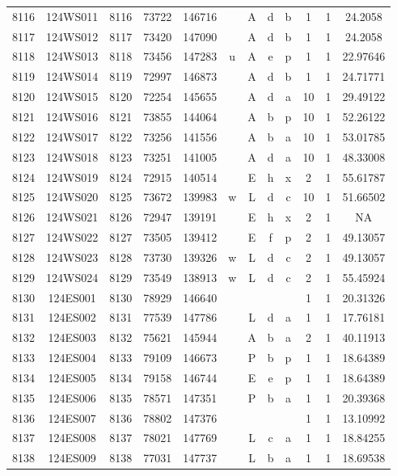 \begin{tabular}{|*{12}{c|}}
8116 & 124WS011 & 8116 & 73722 & 146716 &  & A & d & b & 1 & 1 & 24.2058 \\ 
8117 & 124WS012 & 8117 & 73420 & 147090 &  & A & d & b & 1 & 1 & 24.2058 \\ 
8118 & 124WS013 & 8118 & 73456 & 147283 & u & A & e & p & 1 & 1 & 22.97646 \\ 
8119 & 124WS014 & 8119 & 72997 & 146873 &  & A & d & b & 1 & 1 & 24.71771 \\ 
8120 & 124WS015 & 8120 & 72254 & 145655 &  & A & d & a & 10 & 1 & 29.49122 \\ 
8121 & 124WS016 & 8121 & 73855 & 144064 &  & A & b & p & 10 & 1 & 52.26122 \\ 
8122 & 124WS017 & 8122 & 73256 & 141556 &  & A & b & a & 10 & 1 & 53.01785 \\ 
8123 & 124WS018 & 8123 & 73251 & 141005 &  & A & d & a & 10 & 1 & 48.33008 \\ 
8124 & 124WS019 & 8124 & 72915 & 140514 &  & E & h & x & 2 & 1 & 55.61787 \\ 
8125 & 124WS020 & 8125 & 73672 & 139983 & w & L & d & c & 10 & 1 & 51.66502 \\ 
8126 & 124WS021 & 8126 & 72947 & 139191 &  & E & h & x & 2 & 1 & NA \\ 
8127 & 124WS022 & 8127 & 73505 & 139412 &  & E & f & p & 2 & 1 & 49.13057 \\ 
8128 & 124WS023 & 8128 & 73730 & 139326 & w & L & d & c & 2 & 1 & 49.13057 \\ 
8129 & 124WS024 & 8129 & 73549 & 138913 & w & L & d & c & 2 & 1 & 55.45924 \\ 
8130 & 124ES001 & 8130 & 78929 & 146640 &  &  &  &  & 1 & 1 & 20.31326 \\ 
8131 & 124ES002 & 8131 & 77539 & 147786 &  & L & d & a & 1 & 1 & 17.76181 \\ 
8132 & 124ES003 & 8132 & 75621 & 145944 &  & A & b & a & 2 & 1 & 40.11913 \\ 
8133 & 124ES004 & 8133 & 79109 & 146673 &  & P & b & p & 1 & 1 & 18.64389 \\ 
8134 & 124ES005 & 8134 & 79158 & 146744 &  & E & e & p & 1 & 1 & 18.64389 \\ 
8135 & 124ES006 & 8135 & 78571 & 147351 &  & P & b & a & 1 & 1 & 20.39368 \\ 
8136 & 124ES007 & 8136 & 78802 & 147376 &  &  &  &  & 1 & 1 & 13.10992 \\ 
8137 & 124ES008 & 8137 & 78021 & 147769 &  & L & c & a & 1 & 1 & 18.84255 \\ 
8138 & 124ES009 & 8138 & 77031 & 147737 &  & L & b & a & 1 & 1 & 18.69538 \\ 

\end{tabular}
